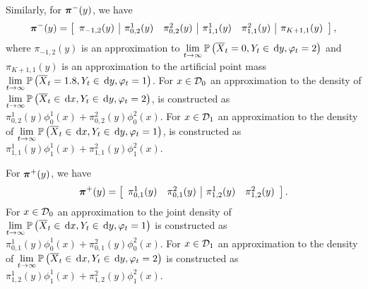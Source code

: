 Similarly, for \( {\boldsymbol\pi}^-(y)\), we have 
\[ {\boldsymbol \pi}^-(y) = \left[\begin{array}{c|cc|cc|c} {\pi}_{-1,2}(y) &  {\pi}_{0,2}^1(y) &  {\pi}_{0,2}^2(y) &  {\pi}_{1,1}^1(y) &  {\pi}_{1,1}^2(y) &  {\pi}_{K+1,1}(y) \end{array}\right],\]
where \( {\pi}_{-1,2}(y)\) is an approximation to \( \lim\limits_{t\to\infty}\mathbb{P}\left(\overline X_t =0, Y_t\in\, \mathrm{d} y, \varphi_{t} = 2\right)\) and \( {\pi}_{K+1,1}(y)\) is an approximation to the artificial point mass \( \lim\limits_{t\to\infty}\mathbb{P}\left(\overline X_t =1.8, Y_t\in \, \mathrm{d} y, \varphi_{t} = 1\right)\). For \(x\in\mathcal{D}_0\) an approximation to the density of \( \lim\limits_{t\to\infty}\mathbb{P}\left(\overline X_t \in \, \mathrm{d} x, Y_t \in \, \mathrm{d} y, \varphi_{t} = 2\right)\), is constructed as \( {\pi}_{0,2}^1(y)\phi_0^1(x) +  {\pi}_{0,2}^2(y)\phi_0^2(x)\). For \(x\in\mathcal{D}_1\) an approximation to the density of \( \lim\limits_{t\to\infty}\mathbb{P}\left(\overline X_t \in \, \mathrm{d} x, Y_t \in \, \mathrm{d} y, \varphi_{t} = 1\right)\), is constructed as \( {\pi}_{1,1}^1(y)\phi_1^1(x) +  {\pi}_{1,1}^2(y)\phi_1^2(x).\)

For \( {\boldsymbol\pi}^+(y)\), we have 
\[ {\boldsymbol \pi}^+(y) = \left[\begin{array}{cc|cc}  {\pi}_{0,1}^1(y) &  {\pi}_{0,1}^2(y) &  {\pi}_{1,2}^1(y) &  {\pi}_{1,2}^2(y) \end{array}\right].\]
For \(x\in\mathcal{D}_0\) an approximation to the joint density of \( \lim\limits_{t\to\infty}\mathbb{P}\left(\overline X_t \in \, \mathrm{d} x, Y_t \in \, \mathrm{d} y, \varphi_{t} = 1\right)\) is constructed as \( {\pi}_{0,1}^1(y)\phi_0^1(x) +  {\pi}_{0,1}^2(y)\phi_0^2(x)\). For \(x\in\mathcal{D}_1\) an approximation to the density of \( \lim\limits_{t\to\infty}\mathbb{P}\left(\overline X_t \in \, \mathrm{d} x, Y_t \in \, \mathrm{d} y, \varphi_{t} = 2\right)\) is constructed as \( {\pi}_{1,2}^1(y)\phi_1^1(x) +  {\pi}_{1,2}^2(y)\phi_1^2(x).\)

